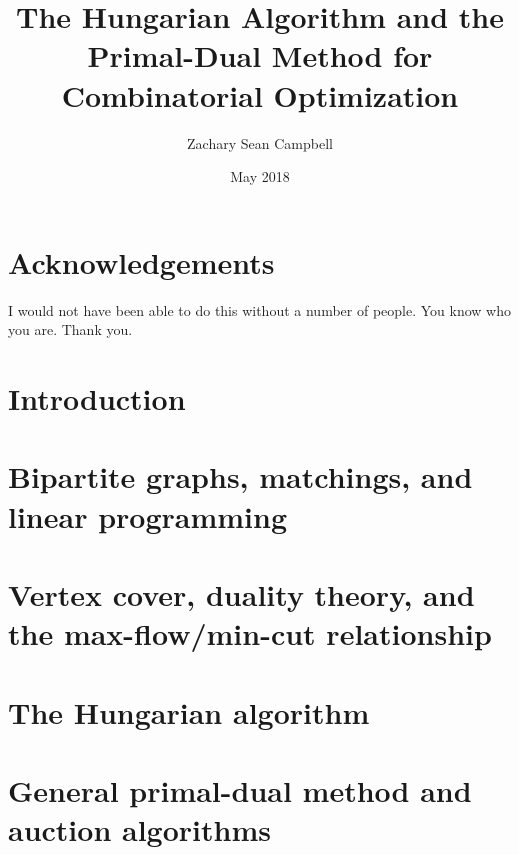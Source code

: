 \documentclass[12pt,twoside]{reedthesis}
\title{The Hungarian Algorithm and the Primal-Dual Method for Combinatorial Optimization}
\author{Zachary Sean Campbell}
\date{May 2018}
\renewcommand{\'}{^{'}}
\theoremstyle{plain}
\theoremstyle{definition}
\begin{document}
    \maketitle
    \frontmatter %
    \pagestyle{empty} %

\chapter*{Acknowledgements}
I would not have been able to do this without a number of people. You know who you are. Thank you.

\tableofcontents

\mainmatter %
\pagestyle{fancyplain} %
\chapter*{Introduction}

	
	
\chapter{Bipartite graphs, matchings, and linear programming}



\chapter{Vertex cover, duality theory, and the max-flow/min-cut relationship}



\chapter{The Hungarian algorithm}



\chapter{General primal-dual method and auction algorithms}


	

\backmatter %

\nocite{*}


\end{document}
